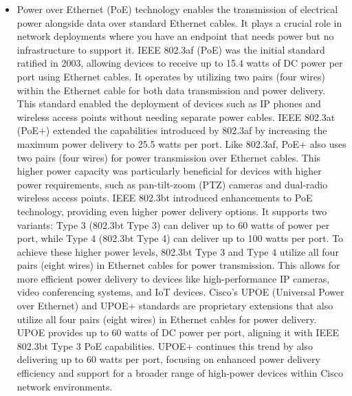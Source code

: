 \documentclass{article}
\begin{document}
\begin{itemize}
	\item[] Power over Ethernet (PoE) technology enables the transmission of electrical power alongside data over standard Ethernet cables. It plays a crucial role in network deployments where you have an endpoint that needs power but no infrastructure to support it. IEEE 802.3af (PoE) was the initial standard ratified in 2003, allowing devices to receive up to 15.4 watts of DC power per port using Ethernet cables. It operates by utilizing two pairs (four wires) within the Ethernet cable for both data transmission and power delivery. This standard enabled the deployment of devices such as IP phones and wireless access points without needing separate power cables. IEEE 802.3at (PoE+) extended the capabilities introduced by 802.3af by increasing the maximum power delivery to 25.5 watts per port. Like 802.3af, PoE+ also uses two pairs (four wires) for power transmission over Ethernet cables. This higher power capacity was particularly beneficial for devices with higher power requirements, such as pan-tilt-zoom (PTZ) cameras and dual-radio wireless access points. IEEE 802.3bt introduced enhancements to PoE technology, providing even higher power delivery options. It supports two variants: Type 3 (802.3bt Type 3) can deliver up to 60 watts of power per port, while Type 4 (802.3bt Type 4) can deliver up to 100 watts per port. To achieve these higher power levels, 802.3bt Type 3 and Type 4 utilize all four pairs (eight wires) in Ethernet cables for power transmission. This allows for more efficient power delivery to devices like high-performance IP cameras, video conferencing systems, and IoT devices. Cisco's UPOE (Universal Power over Ethernet) and UPOE+ standards are proprietary extensions that also utilize all four pairs (eight wires) in Ethernet cables for power delivery. UPOE provides up to 60 watts of DC power per port, aligning it with IEEE 802.3bt Type 3 PoE capabilities. UPOE+ continues this trend by also delivering up to 60 watts per port, focusing on enhanced power delivery efficiency and support for a broader range of high-power devices within Cisco network environments.
  

\end{itemize}
\end{document}
